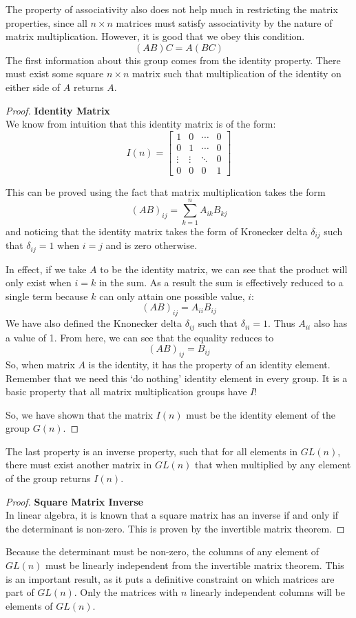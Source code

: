 The property of associativity also does not help much in restricting the matrix properties, since all $n\times n$ matrices must satisfy associativity by the nature of matrix multiplication. However, it is good that we obey this condition.
$$(AB)C=A(BC)$$
The first information about this group comes from the identity property. There must exist some square $n\times n$ matrix such that multiplication of the identity on either side of $A$ returns $A$.

\begin{proof}
\textbf{Identity Matrix}\\
    We know from intuition that this identity matrix is of the form:
$$I(n)=\begin{bmatrix}
    1 & 0  &\cdots &0\\
    0&1&\cdots&0\\
    \vdots&\vdots&\ddots&0\\
    0&0&0&1
\end{bmatrix}$$

This can be proved using the fact that matrix multiplication takes the form
$$(AB)_{ij}=\sum_{k=1}^n{A_{ik}}{B}_{kj}$$
and noticing that the identity matrix takes the form of Kronecker delta $\delta_{ij}$ such that $\delta_{ij}=1$ when $i=j$ and is zero otherwise.

In effect, if we take $A$ to be the identity matrix, we can see that the product will only exist when $i=k$ in the sum. As a result the sum is effectively reduced to a single term because $k$ can only attain one possible value, $i$:
$$(AB)_{ij}={A_{ii}}{B}_{ij}$$
We have also defined the Knonecker delta $\delta_{ij}$ such that $\delta_{ii}=1$. Thus $A_{ii}$ also has a value of 1. From here, we can see that the equality reduces to
$$(AB)_{ij}={B}_{ij}$$
So, when matrix $A$ is the identity, it has the property of an identity element. Remember that we need this `do nothing' identity element in every group. It is a basic property that all matrix multiplication groups have $I$!

So, we have shown that the matrix $I(n)$ must be the identity element of the group $G(n)$.
\end{proof}

The last property is an inverse property, such that for all elements in $GL(n)$, there must exist another matrix in $GL(n)$ that when multiplied by any element of the group returns $I(n)$. 

\begin{proof}
\textbf{Square Matrix Inverse}\\
In linear algebra, it is known that a square matrix has an inverse if and only if the determinant is non-zero. This is proven by the invertible matrix theorem.
\end{proof}
Because the determinant must be non-zero, the columns of any element of $GL(n)$ must be linearly independent from the invertible matrix theorem. This is an important result, as it puts a definitive constraint on which matrices are part of $GL(n)$. Only the matrices with $n$ linearly independent columns will be elements of $GL(n)$.


